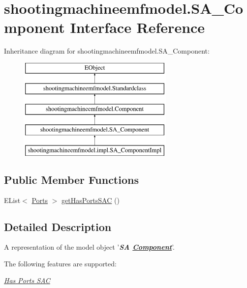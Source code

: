 \hypertarget{interfaceshootingmachineemfmodel_1_1_s_a___component}{\section{shootingmachineemfmodel.\-S\-A\-\_\-\-Component Interface Reference}
\label{interfaceshootingmachineemfmodel_1_1_s_a___component}
}
Inheritance diagram for shootingmachineemfmodel.\-S\-A\-\_\-\-Component\-:\begin{figure}[H]
\begin{center}
\leavevmode
\includegraphics[height=5.000000cm]{interfaceshootingmachineemfmodel_1_1_s_a___component}
\end{center}
\end{figure}
\subsection*{Public Member Functions}
\begin{DoxyCompactItemize}
\item 
E\-List$<$ \hyperlink{interfaceshootingmachineemfmodel_1_1_ports}{Ports} $>$ \hyperlink{interfaceshootingmachineemfmodel_1_1_s_a___component_a40d33336124d09c0ed978cc1ccf30bda}{get\-Has\-Ports\-S\-A\-C} ()
\end{DoxyCompactItemize}


\subsection{Detailed Description}
A representation of the model object '{\itshape {\bfseries S\-A \hyperlink{interfaceshootingmachineemfmodel_1_1_component}{Component}}}'.

The following features are supported\-: 
\begin{DoxyItemize}
\item \hyperlink{interfaceshootingmachineemfmodel_1_1_s_a___component_a40d33336124d09c0ed978cc1ccf30bda}{{\itshape Has Ports S\-A\-C}} 
\end{DoxyItemize}

